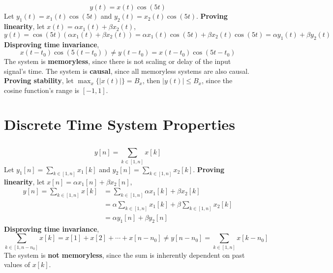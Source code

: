 \documentclass{article}
\begin{document}
\subsection{}

\begin{equation}
    y(t) = x(t) \cos(5t)
\end{equation}
Let \(y_1(t) = x_1(t) \cos(5t)\) and \(y_2(t) = x_2(t) \cos(5t)\).
\textbf{Proving linearity}, let \(x(t) = \alpha x_1(t) + \beta x_2(t)\),
\begin{equation}
    y(t) = \cos(5t) (\alpha x_1(t) + \beta x_2(t)) = \alpha x_1(t) \cos(5t) + \beta x_2(t) \cos(5t) = \alpha y_1(t) + \beta y_2(t)
\end{equation}
\textbf{Disproving time invariance},
\begin{equation}
    x(t - t_0) \cos(5 (t - t_0)) \neq y(t - t_0) = x(t - t_0) \cos(5t - t_0)
\end{equation}
The system is \textbf{memoryless}, since there is not scaling or delay of the input signal's time.
The system is \textbf{causal}, since all memoryless systems are also causal.
\textbf{Proving stability}, let \(\max_x\{|x(t)|\} = B_x\), then \(|y(t)| \leqslant B_x\), since the cosine function's range is \([-1, 1]\).

\section{Discrete Time System Properties}

\subsection{}

\begin{equation}
    y[n] = \sum_{k \in [1, n]} x[k]
\end{equation}
Let \(y_1[n] = \sum_{k \in [1, n]} x_1[k]\) and \(y_2[n] = \sum_{k \in [1, n]} x_2[k]\).
\textbf{Proving linearity}, let \(x[n] = \alpha x_1[n] + \beta x_2[n]\),
\begin{align}
    y[n] = \sum_{k \in [1, n]} x[k] &= \sum_{k \in [1, n]} \alpha x_1[k] + \beta x_2[k] \\
    &= \alpha \sum_{k \in [1, n]} x_1[k] + \beta \sum_{k \in [1, n]} x_2[k] \\
    &= \alpha y_1[n] + \beta y_2[n]
\end{align}
\textbf{Disproving time invariance},
\begin{equation}
    \sum_{k \in [1, n - n_0]} x[k] = x[1] + x[2] + \cdots + x[n - n_0] \neq y[n - n_0] = \sum_{k \in [1, n]} x[k - n_0]
\end{equation}
The system is \textbf{not memoryless}, since the sum is inherently dependent on past values of \(x[k]\).
\end{document}
